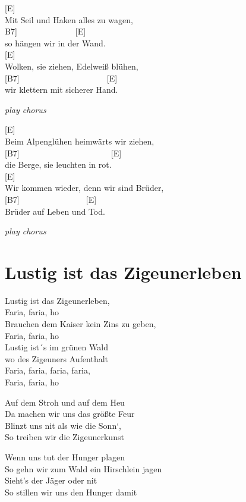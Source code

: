 \documentclass[
  letterpaper,
  a5paper]{memoir}
\begin{document}
{[}E{]}~~~~~~\\
Mit Seil und Haken alles zu wagen,\\
\hspace*{0.333em}\hspace*{0.333em}{[}B7{]}~~~~~~~~~~~~~~{[}E{]}\\
so hängen wir in der Wand.\\
{[}E{]}~~~~~\\
Wolken, sie ziehen, Edelweiß blühen,\\
{[}B7{]}~~~~~~~~~~~~~~~~~~~~~{[}E{]}\\
wir klettern mit sicherer Hand.

\emph{play chorus}

{[}E{]}\\
Beim Alpenglühen heimwärts wir ziehen,\\
{[}B7{]}~~~~~~~~~~~~~~~~~~~~~~{[}E{]}\\
die Berge, sie leuchten in rot.\\
{[}E{]}~~~~~~~~~~~~~~~~~~~\\
Wir kommen wieder, denn wir sind Brüder,\\
{[}B7{]}~~~~~~~~~~~~~~~~{[}E{]}\\
Brüder auf Leben und Tod.

\emph{play chorus}

\hypertarget{lustig-ist-das-zigeunerleben}{%
\chapter{Lustig ist das
Zigeunerleben}\label{lustig-ist-das-zigeunerleben}}

Lustig ist das Zigeunerleben,\\
Faria, faria, ho\\
Brauchen dem Kaiser kein Zins zu geben,\\
Faria, faria, ho\\
Lustig ist´s im grünen Wald\\
wo des Zigeuners Aufenthalt\\
Faria, faria, faria, faria,\\
Faria, faria, ho

Auf dem Stroh und auf dem Heu\\
Da machen wir uns das größte Feur\\
Blinzt uns nit als wie die Sonn`,\\
So treiben wir die Zigeunerkunst

Wenn uns tut der Hunger plagen\\
So gehn wir zum Wald ein Hirschlein jagen\\
Sieht's der Jäger oder nit\\
So stillen wir uns den Hunger damit
\end{document}
